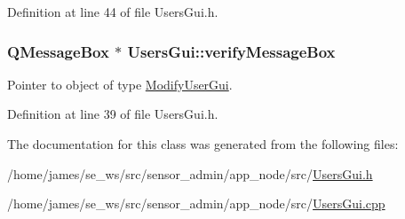 Definition at line 44 of file Users\-Gui.\-h.

\hypertarget{class_users_gui_a2106e2bb4eff998f492a727fe611acf4}{
\subsubsection[{verify\-Message\-Box}]{\setlength{\rightskip}{0pt plus 5cm}Q\-Message\-Box $\ast$ Users\-Gui\-::verify\-Message\-Box\hspace{0.3cm}{\ttfamily [private]}}}\label{class_users_gui_a2106e2bb4eff998f492a727fe611acf4}
Pointer to object of type \hyperlink{class_modify_user_gui}{Modify\-User\-Gui}. 

Definition at line 39 of file Users\-Gui.\-h.



The documentation for this class was generated from the following files\-:\begin{DoxyCompactItemize}
\item 
/home/james/se\-\_\-ws/src/sensor\-\_\-admin/app\-\_\-node/src/\hyperlink{app__node_2src_2_users_gui_8h}{Users\-Gui.\-h}\item 
/home/james/se\-\_\-ws/src/sensor\-\_\-admin/app\-\_\-node/src/\hyperlink{app__node_2src_2_users_gui_8cpp}{Users\-Gui.\-cpp}\end{DoxyCompactItemize}
